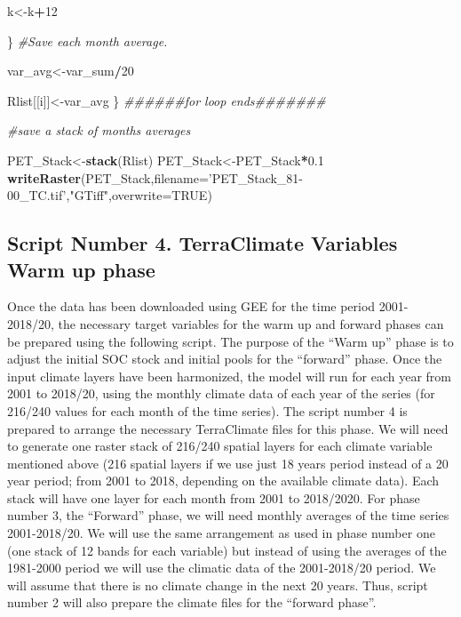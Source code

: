 \documentclass[
  10pt,
  b5paper,
]{book}
\newenvironment{Shaded}{\begin{snugshade}}{\end{snugshade}}
\newcommand{\CommentTok}[1]{\textcolor[rgb]{0.56,0.35,0.01}{\textit{#1}}}
\newcommand{\DataTypeTok}[1]{\textcolor[rgb]{0.13,0.29,0.53}{#1}}
\newcommand{\DecValTok}[1]{\textcolor[rgb]{0.00,0.00,0.81}{#1}}
\newcommand{\FloatTok}[1]{\textcolor[rgb]{0.00,0.00,0.81}{#1}}
\newcommand{\KeywordTok}[1]{\textcolor[rgb]{0.13,0.29,0.53}{\textbf{#1}}}
\newcommand{\NormalTok}[1]{#1}
\newcommand{\OperatorTok}[1]{\textcolor[rgb]{0.81,0.36,0.00}{\textbf{#1}}}
\newcommand{\OtherTok}[1]{\textcolor[rgb]{0.56,0.35,0.01}{#1}}
\newcommand{\StringTok}[1]{\textcolor[rgb]{0.31,0.60,0.02}{#1}}
\begin{document}
\begin{Shaded}
\begin{Highlighting}[]
\NormalTok{k<-k}\OperatorTok{+}\DecValTok{12}

\NormalTok{\}}
\CommentTok{#Save each month average. }

\NormalTok{var_avg<-var_sum}\OperatorTok{/}\DecValTok{20}


\NormalTok{Rlist[[i]]<-var_avg}
\NormalTok{\}}
\CommentTok{######for loop ends#######}

\CommentTok{#save a stack of months averages}

\NormalTok{PET_Stack<-}\KeywordTok{stack}\NormalTok{(Rlist)}
\NormalTok{PET_Stack<-PET_Stack}\OperatorTok{*}\FloatTok{0.1}
\KeywordTok{writeRaster}\NormalTok{(PET_Stack,}\DataTypeTok{filename=}\StringTok{'PET_Stack_81-00_TC.tif'}\NormalTok{,}\StringTok{"GTiff"}\NormalTok{,}\DataTypeTok{overwrite=}\OtherTok{TRUE}\NormalTok{)}
\end{Highlighting}
\end{Shaded}

\hypertarget{script-number-4.-terraclimate-variables-warm-up-phase}{%
\subsection{Script Number 4. TerraClimate Variables Warm up phase}\label{script-number-4.-terraclimate-variables-warm-up-phase}}

Once the data has been downloaded using GEE for the time period 2001-2018/20, the necessary target variables for the warm up and forward phases can be prepared using the following script. The purpose of the ``Warm up'' phase is to adjust the initial SOC stock and initial pools for the ``forward'' phase. Once the input climate layers have been harmonized, the model will run for each year from 2001 to 2018/20, using the monthly climate data of each year of the series (for 216/240 values for each month of the time series). The script number 4 is prepared to arrange the necessary TerraClimate files for this phase. We will need to generate one raster stack of 216/240 spatial layers for each climate variable mentioned above (216 spatial layers if we use just 18 years period instead of a 20 year period; from 2001 to 2018, depending on the available climate data). Each stack will have one layer for each month from 2001 to 2018/2020. For phase number 3, the ``Forward'' phase, we will need monthly averages of the time series 2001-2018/20. We will use the same arrangement as used in phase number one (one stack of 12 bands for each variable) but instead of using the averages of the 1981-2000 period we will use the climatic data of the 2001-2018/20 period. We will assume that there is no climate change in the next 20 years. Thus, script number 2 will also prepare the climate files for the ``forward phase''.
\end{document}
